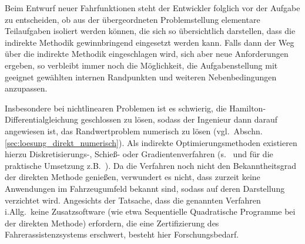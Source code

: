 

Beim Entwurf neuer Fahrfunktionen steht der Entwickler folglich vor der Aufgabe zu entscheiden, ob aus der übergeordneten Problemstellung elementare Teilaufgaben isoliert werden können, die sich so übersichtlich darstellen, dass die indirekte Methodik gewinnbringend eingesetzt werden kann. Falls dann der Weg über die indirekte Methodik eingeschlagen wird, sich aber neue Anforderungen ergeben, so verbleibt immer noch die Möglichkeit, die Aufgabenstellung mit geeignet gewählten internen Randpunkten und weiteren Nebenbedingungen anzupassen.

Insbesondere bei nichtlinearen Problemen ist es schwierig, die Hamilton-Differentialgleichung geschlossen zu lösen, sodass der Ingenieur dann darauf angewiesen ist, das Randwertproblem numerisch zu lösen (vgl.\ Abschn.\,\ref{sec:loesung_direkt_numerisch}).  Als indirekte Optimierungsmethoden existieren hierzu Diskretisierungs-, Schieß- oder Gradientenverfahren (s.\ \cite{papageorgiou2012optimierung} und für die praktische Umsetzung z.B.\ \cite{graichen_suboptimal}). Da die Verfahren noch nicht den Bekanntheitsgrad der direkten Methode genießen, verwundert es nicht, dass zurzeit keine Anwendungen im Fahrzeugumfeld bekannt sind, sodass auf deren Darstellung verzichtet wird. Angesichts der Tatsache, dass die genannten Verfahren i.Allg.\ keine Zusatzsoftware (wie etwa Sequentielle Quadratische Programme bei der direkten Methode) erfordern, die eine Zertifizierung des Fahrerassistenzsystems erschwert, besteht hier Forschungsbedarf.




\cleardoublepage

